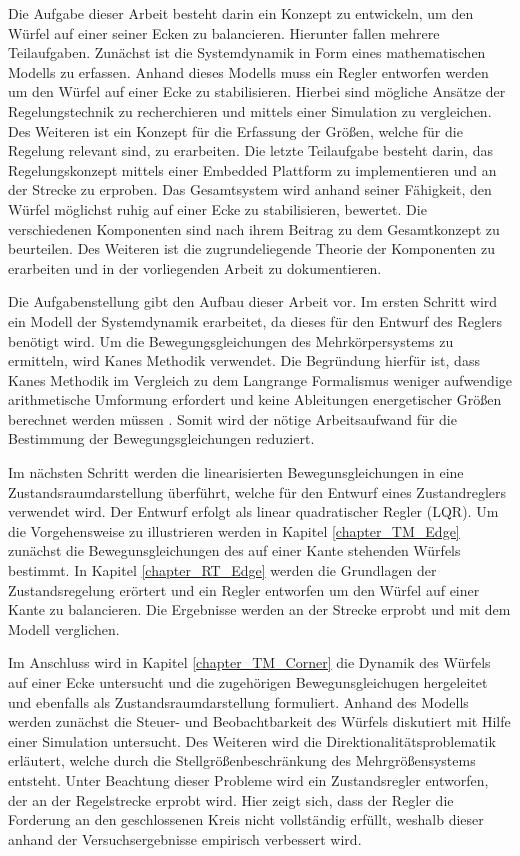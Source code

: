 Die Aufgabe dieser Arbeit besteht darin ein Konzept zu entwickeln, um den Würfel auf einer seiner Ecken zu balancieren. Hierunter fallen mehrere Teilaufgaben. Zunächst ist die Systemdynamik in Form eines mathematischen Modells zu erfassen. Anhand dieses Modells muss ein Regler entworfen werden um den Würfel auf einer Ecke zu stabilisieren. Hierbei sind mögliche Ansätze der Regelungstechnik zu recherchieren und mittels einer Simulation zu vergleichen. Des Weiteren ist ein Konzept für die Erfassung der Größen, welche für die Regelung relevant sind, zu erarbeiten. Die letzte Teilaufgabe besteht darin, das Regelungskonzept mittels einer Embedded Plattform zu implementieren und an der Strecke zu erproben. Das Gesamtsystem wird anhand seiner Fähigkeit, den Würfel möglichst ruhig auf einer Ecke zu stabilisieren, bewertet. Die verschiedenen Komponenten sind nach ihrem Beitrag zu dem Gesamtkonzept zu beurteilen. Des Weiteren ist die zugrundeliegende Theorie der Komponenten zu erarbeiten und in der vorliegenden Arbeit zu dokumentieren.

Die Aufgabenstellung gibt den Aufbau dieser Arbeit vor. Im ersten Schritt wird ein Modell der Systemdynamik erarbeitet, da dieses für den Entwurf des Reglers benötigt wird. Um die Bewegungsgleichungen des Mehrkörpersystems zu ermitteln, wird Kanes Methodik \cite{KaneBook} verwendet. Die Begründung hierfür ist, dass Kanes Methodik im Vergleich zu dem Langrange Formalismus weniger aufwendige arithmetische Umformung erfordert und keine Ableitungen energetischer Größen berechnet werden müssen \cite[S. 61 ff.]{Zetina}. Somit wird der nötige Arbeitsaufwand für die Bestimmung der Bewegungsgleichungen reduziert.

Im nächsten Schritt werden die linearisierten Bewegunsgleichungen in eine Zustandsraumdarstellung überführt, welche für den Entwurf eines Zustandreglers verwendet wird. Der Entwurf erfolgt als linear quadratischer Regler (LQR). Um die Vorgehensweise zu illustrieren werden in  Kapitel \ref{chapter_TM_Edge} zunächst die Bewegunsgleichungen des auf einer Kante stehenden Würfels bestimmt. In Kapitel \ref{chapter_RT_Edge} werden die Grundlagen der Zustandsregelung erörtert und ein Regler entworfen um den Würfel auf einer Kante zu balancieren. Die Ergebnisse werden an der Strecke erprobt und mit dem Modell verglichen.

Im Anschluss wird in Kapitel \ref{chapter_TM_Corner} die Dynamik des Würfels auf einer Ecke untersucht und die zugehörigen Bewegunsgleichugen hergeleitet und ebenfalls als Zustandsraumdarstellung formuliert. Anhand des Modells werden zunächst die Steuer- und Beobachtbarkeit des Würfels diskutiert mit Hilfe einer Simulation untersucht. Des Weiteren wird die Direktionalitätsproblematik erläutert, welche durch die Stellgrößenbeschränkung des Mehrgrößensystems entsteht. Unter Beachtung dieser Probleme wird ein Zustandsregler entworfen, der an der Regelstrecke erprobt wird. Hier zeigt sich, dass der Regler die Forderung an den geschlossenen Kreis nicht vollständig erfüllt, weshalb dieser anhand der Versuchsergebnisse empirisch verbessert wird.

